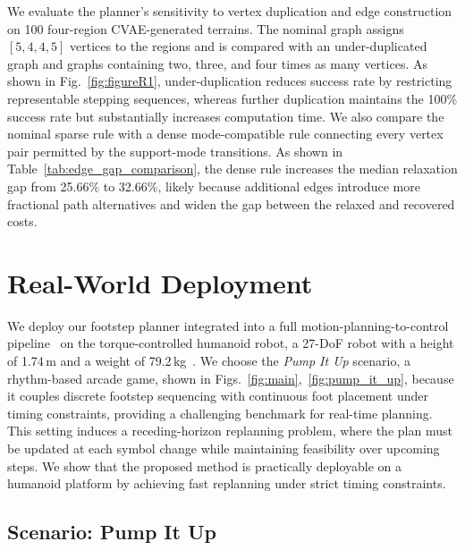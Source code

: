 \documentclass[letterpaper, 10 pt, journal, twoside]{IEEEtran}
\begin{document}
\endgroup

We evaluate the planner's sensitivity to vertex duplication and edge construction on 100 four-region CVAE-generated terrains.
The nominal graph assigns $[5,4,4,5]$ vertices to the regions and is compared with an under-duplicated graph and graphs containing two, three, and four times as many vertices.
As shown in Fig.~\ref{fig:figureR1}, under-duplication reduces success rate by restricting representable stepping sequences, whereas further duplication maintains the 100\% success rate but substantially increases computation time.
We also compare the nominal sparse rule with a dense mode-compatible rule connecting every vertex pair permitted by the support-mode transitions.
As shown in Table~\ref{tab:edge_gap_comparison}, the dense rule increases the median relaxation gap from 25.66\% to 32.66\%, likely because additional edges introduce more fractional path alternatives and widen the gap between the relaxed and recovered costs.

\section{Real-World Deployment}

We deploy our footstep planner integrated into a full motion-planning-to-control pipeline~\cite{mesesan2025motion,schuller2026centroidal} on the torque-controlled humanoid robot, a 27-DoF robot with a height of 1.74\,m and a weight of 79.2\,kg~\cite{englsberger2014overview}.
We choose the \textit{Pump It Up} scenario, a rhythm-based arcade game, shown in Figs.~\ref{fig:main},~\ref{fig:pump_it_up}, because it couples discrete footstep sequencing with continuous foot placement under timing constraints, providing a challenging benchmark for real-time planning. 
This setting induces a receding-horizon replanning problem, where the plan must be updated at each symbol change while maintaining feasibility over upcoming steps.
We show that the proposed method is practically deployable on a humanoid platform by achieving fast replanning under strict timing constraints.

\subsection{Scenario: Pump It Up}
\end{document}
